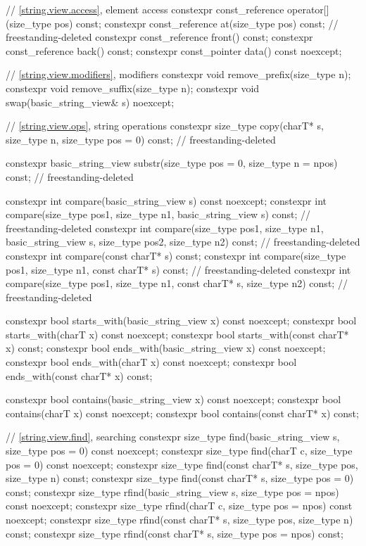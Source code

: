 \begin{codeblock}
{{    // \ref{string.view.access}, element access
    constexpr const_reference operator[](size_type pos) const;
    constexpr const_reference at(size_type pos) const;                  // freestanding-deleted
    constexpr const_reference front() const;
    constexpr const_reference back() const;
    constexpr const_pointer data() const noexcept;

    // \ref{string.view.modifiers}, modifiers
    constexpr void remove_prefix(size_type n);
    constexpr void remove_suffix(size_type n);
    constexpr void swap(basic_string_view& s) noexcept;

    // \ref{string.view.ops}, string operations
    constexpr size_type copy(charT* s, size_type n,
                             size_type pos = 0) const;                  // freestanding-deleted

    constexpr basic_string_view substr(size_type pos = 0,
                                       size_type n = npos) const;       // freestanding-deleted

    constexpr int compare(basic_string_view s) const noexcept;
    constexpr int compare(size_type pos1, size_type n1,
                          basic_string_view s) const;                   // freestanding-deleted
    constexpr int compare(size_type pos1, size_type n1, basic_string_view s,
                          size_type pos2, size_type n2) const;          // freestanding-deleted
    constexpr int compare(const charT* s) const;
    constexpr int compare(size_type pos1, size_type n1,
                          const charT* s) const;                        // freestanding-deleted
    constexpr int compare(size_type pos1, size_type n1, const charT* s,
                          size_type n2) const;                          // freestanding-deleted

    constexpr bool starts_with(basic_string_view x) const noexcept;
    constexpr bool starts_with(charT x) const noexcept;
    constexpr bool starts_with(const charT* x) const;
    constexpr bool ends_with(basic_string_view x) const noexcept;
    constexpr bool ends_with(charT x) const noexcept;
    constexpr bool ends_with(const charT* x) const;

    constexpr bool contains(basic_string_view x) const noexcept;
    constexpr bool contains(charT x) const noexcept;
    constexpr bool contains(const charT* x) const;

    // \ref{string.view.find}, searching
    constexpr size_type find(basic_string_view s, size_type pos = 0) const noexcept;
    constexpr size_type find(charT c, size_type pos = 0) const noexcept;
    constexpr size_type find(const charT* s, size_type pos, size_type n) const;
    constexpr size_type find(const charT* s, size_type pos = 0) const;
    constexpr size_type rfind(basic_string_view s, size_type pos = npos) const noexcept;
    constexpr size_type rfind(charT c, size_type pos = npos) const noexcept;
    constexpr size_type rfind(const charT* s, size_type pos, size_type n) const;
    constexpr size_type rfind(const charT* s, size_type pos = npos) const;

}}
\end{codeblock}
